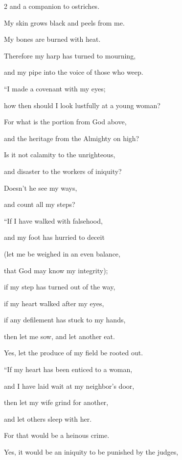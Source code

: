 \begin{multicols}{2}
	and a companion to ostriches.
	
	\myverse{}My skin grows black and peels from me.
	
	My bones are burned with heat.
	
	\myverse{}Therefore my harp has turned to mourning,
	
	and my pipe into the voice of those who weep.
	
	
	
	
	\mychapter{} \myverse*{}“I made a covenant with my eyes;
	
	\quad\quad how then should I look lustfully at a young woman?
	
	\myverse{}For what is the portion from God above,
	
	and the heritage from the Almighty on high?
	
	\myverse{}Is it not calamity to the unrighteous,
	
	and disaster to the workers of iniquity?
	
	\myverse{}Doesn’t he see my ways,
	
	and count all my steps?
	
	\vspace{\baselineskip}
	
	\myverse{}“If I have walked with falsehood,
	
	and my foot has hurried to deceit
	
	\myverse{}(let me be weighed in an even balance,
	
	that God may know my integrity);
	
	\myverse{}if my step has turned out of the way,
	
	if my heart walked after my eyes,
	
	if any defilement has stuck to my hands,
	
	\myverse{}then let me sow, and let another eat.
	
	Yes, let the produce of my field be rooted out.
	
	\vspace{\baselineskip}
	
	
	\myverse{}“If my heart has been enticed to a woman,
	
	and I have laid wait at my neighbor’s door,
	
	\myverse{}then let my wife grind for another,
	
	and let others sleep with her.
	
	\myverse{}For that would be a heinous crime.
	
	Yes, it would be an iniquity to be punished by the judges,
	

\end{multicols}
